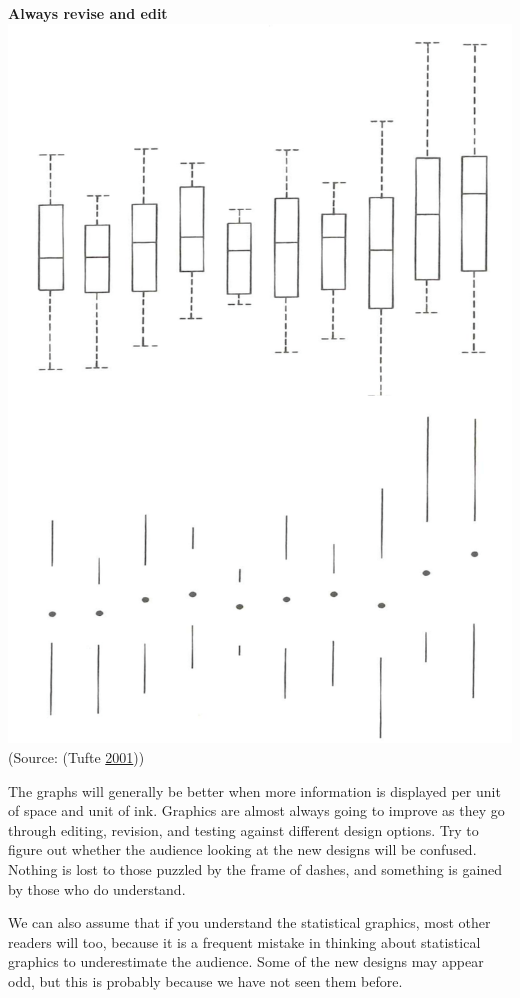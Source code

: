 \documentclass[]{book}
\theoremstyle{definition}
\theoremstyle{definition}
\theoremstyle{definition}
\theoremstyle{remark}
\begin{document}
\textbf{Always revise and edit}
\includegraphics{images/Tufte_figure4.png} (Source: (Tufte
\protect\hyperlink{ref-Tufte_2001}{2001}))

The graphs will generally be better when more information is displayed
per unit of space and unit of ink. Graphics are almost always going to
improve as they go through editing, revision, and testing against
different design options. Try to figure out whether the audience looking
at the new designs will be confused. Nothing is lost to those puzzled by
the frame of dashes, and something is gained by those who do understand.

We can also assume that if you understand the statistical graphics, most
other readers will too, because it is a frequent mistake in thinking
about statistical graphics to underestimate the audience. Some of the
new designs may appear odd, but this is probably because we have not
seen them before.
\end{document}
